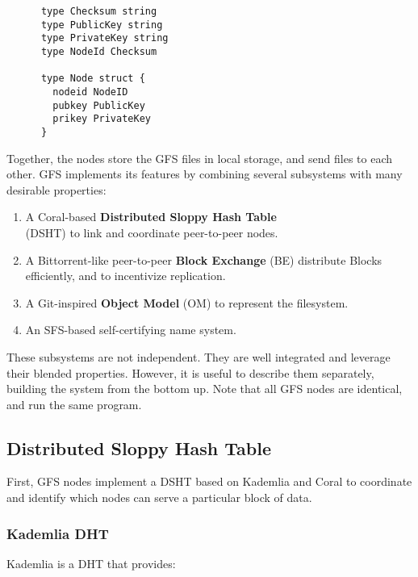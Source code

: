 \documentclass{sig-alternate}
\begin{document}
\begin{verbatim}
      type Checksum string
      type PublicKey string
      type PrivateKey string
      type NodeId Checksum

      type Node struct {
        nodeid NodeID
        pubkey PublicKey
        prikey PrivateKey
      }
\end{verbatim}


Together, the
nodes store the GFS files in local storage, and send files to each other.
GFS implements its features by combining several subsystems with many
desirable properties:

\begin{enumerate}
  \item A Coral-based \textbf{Distributed Sloppy Hash Table}\\
        (DSHT) to link and coordinate peer-to-peer nodes.
  \item A Bittorrent-like peer-to-peer \textbf{Block Exchange} (BE) distribute
        Blocks efficiently, and to incentivize replication.
  \item A Git-inspired \textbf{Object Model} (OM) to represent the filesystem.
  \item An SFS-based self-certifying name system.
\end{enumerate}


These subsystems are not independent. They are well integrated and leverage
their blended properties. However, it is useful to describe them separately,
building the system from the bottom up. Note that all GFS nodes are identical,
and run the same program.

\subsection{Distributed Sloppy Hash Table}

First, GFS nodes implement a DSHT based on Kademlia and Coral to coordinate
and identify which nodes can serve a particular block of data.

\subsubsection{Kademlia DHT}

Kademlia is a DHT that provides:
\end{document}
